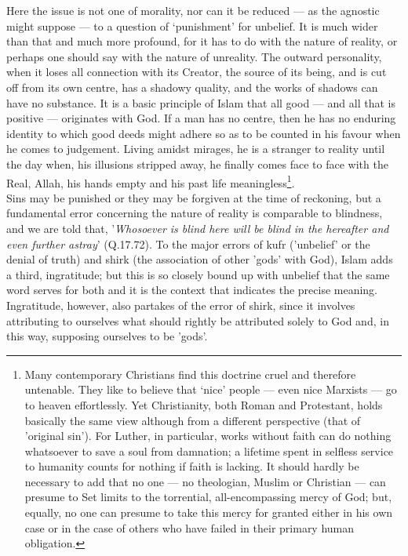 \documentclass[10pt, twoside]{book}
\begin{document}
Here the issue is not one of morality, nor can it be reduced --- as the agnostic might suppose --- to a 
question of `punishment' for unbelief. It is much wider than that and much more profound, for it has 
to do with the nature of reality, or perhaps one should say with the nature of unreality. The outward 
personality, when it loses all connection with its Creator, the source of its being, and is cut off 
from its own centre, has a shadowy quality, and the works of shadows can have no substance. It is a 
basic principle of Islam that all good --- and all that is positive --- originates with God. If a man has 
no centre, then he has no enduring identity to which good deeds might adhere so as to be counted in 
his favour when he comes to judgement. Living amidst mirages, he is a stranger to reality until the 
day when, his illusions stripped away, he finally comes face to face with the Real, Allah, his hands 
empty and his past life meaningless\footnote{Many contemporary Christians find this doctrine cruel and therefore untenable. They like to believe 
that `nice' people --- even nice Marxists --- go to heaven effortlessly. Yet Christianity, both Roman and 
Protestant, holds basically the same view although from a different perspective (that of 'original 
sin'). For Luther, in particular, works without faith can do nothing whatsoever to save a soul from 
damnation; a lifetime spent in selfless service to humanity counts for nothing if faith is lacking. 
It should hardly be necessary to add that no one --- no theologian, Muslim or Christian --- can presume 
to Set limits to the torrential, all\hyp{}encompassing mercy of God; but, equally, no one can presume to 
take this mercy for granted either in his own case or in the case of others who have failed in their 
primary human obligation.}.\\

Sins may be punished or they may be forgiven at the time of reckoning, but a fundamental error 
concerning the nature of reality is comparable to blindness, and we are told that, '\emph{Whosoever is 
blind here will be blind in the hereafter and even further astray}' (Q.17.72). To the major errors of 
kufr ('unbelief' or the denial of truth) and shirk (the association of other 'gods' with God), Islam 
adds a third, ingratitude; but this is so closely bound up with unbelief that the same word serves 
for both and it is the context that indicates the precise meaning. Ingratitude, however, also 
partakes of the error of shirk, since it involves attributing to ourselves what should rightly be 
attributed solely to God and, in this way, supposing ourselves to be 'gods'. \\
\end{document}

